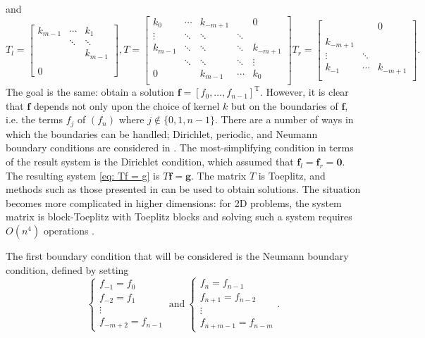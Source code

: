 \documentclass[12pt,notitlepage]{report}
\newcommand{\gVec}{\mathbf{g}}	%
\newcommand{\fVec}{\mathbf{f}}	%
\newcommand{\trans}{\mathrm{T}}	%
\begin{document}
and
\[T_{l} = \begin{bmatrix}
k_{m-1} & \cdots & k_{1} \\
 & \ddots & \ddots \\
 & & k_{m-1} \\
 & & \\
0 & & 
\end{bmatrix},
T = \begin{bmatrix}
k_{0} & \cdots & k_{-m+1} & & 0 \\
\vdots & \ddots & \ddots & \ddots &  \\
k_{m-1} & \ddots & \ddots & \ddots & k_{-m+1} \\
 & \ddots & \ddots & \ddots & \vdots \\
0 & & k_{m-1} & \cdots & k_{0} \\
\end{bmatrix}
T_{r} = \begin{bmatrix}
 & & 0 \\
 & & \\
k_{-m+1} & & \\
\vdots & \ddots &  \\
k_{-1} & \cdots & k_{-m+1} \\
\end{bmatrix}.\]
The goal is the same: obtain a solution $\fVec = [f_0,\ldots,f_{n-1}]^\trans$. However, it is clear that $\fVec$ depends not only upon the choice of kernel $k$ but on the boundaries of $\fVec$, i.e. the terms $f_j$ of $(f_n)$ where $j \not\in \{0,1,n-1\}$. There are a number of ways in which the boundaries can be handled; Dirichlet, periodic, and Neumann boundary conditions are considered in \cite{NeumannDCT}. The most-simplifying condition in terms of the result system is the Dirichlet condition, which assumed that $\fVec_l = \fVec_r = \bm{0}$. The resulting system \eqref{eq: Tf = g} is $T\fVec = \gVec$. The matrix $T$ is Toeplitz, and methods such as those presented in \cite{Vogel:2002} can be used to obtain solutions. The situation becomes more complicated in higher dimensions: for 2D problems, the system matrix is block-Toeplitz with Toeplitz blocks and solving such a system requires $O(n^4)$ operations \cite{KalouptsidisCarayannisManolakis}. \par 
The first boundary condition that will be considered is the Neumann boundary condition, defined by setting
\[\begin{cases}
f_{-1} = f_0 \\
f_{-2} = f_1 \\
\vdots \\
f_{-m+2} = f_{n-1}
\end{cases} ~ \text{and} ~
\begin{cases}
f_{n} = f_{n-1} \\
f_{n+1} = f_{n-2} \\
\vdots \\
f_{n+m-1} = f_{n-m}
\end{cases}.\]
\end{document}
